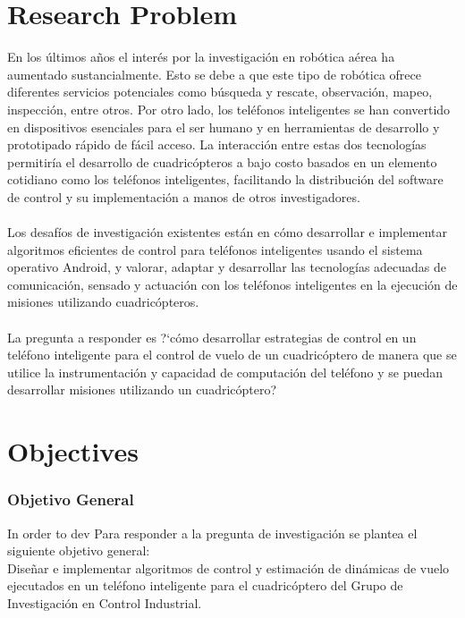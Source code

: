 \section{Research Problem}
En los últimos años el interés por la investigación en robótica aérea ha aumentado sustancialmente. Esto se debe a que este tipo de robótica ofrece diferentes servicios potenciales como búsqueda y rescate, observación, mapeo, inspección, entre otros. Por otro lado, los teléfonos inteligentes se han convertido en dispositivos esenciales para el ser humano y en herramientas de desarrollo y prototipado rápido de fácil acceso. La interacción entre estas dos tecnologías permitiría el desarrollo de cuadricópteros a bajo costo basados en un elemento cotidiano como los teléfonos inteligentes, facilitando la distribución del software de control y su implementación a manos de otros investigadores.
\\\\
Los  desafíos  de  investigación  existentes  están en  cómo  desarrollar  e  implementar  algoritmos eficientes de control para teléfonos inteligentes usando el sistema operativo Android, y  valorar,  adaptar  y  desarrollar  las  tecnologías  adecuadas  de  comunicación,  sensado  y actuación con los teléfonos inteligentes en la ejecución de misiones utilizando cuadricópteros.
\\\\
La pregunta a responder es ?`cómo desarrollar estrategias de control en un teléfono inteligente para el control de vuelo de un cuadricóptero de manera que se utilice la instrumentación y capacidad de computación del teléfono y se puedan desarrollar misiones utilizando un cuadricóptero?\\
\section{Objectives}
\subsubsection{Objetivo General}
In order to dev
Para responder a la pregunta de investigación se plantea el siguiente objetivo general:\\
Diseñar e implementar algoritmos de control y estimación de dinámicas de vuelo ejecutados en un teléfono inteligente para el cuadricóptero del Grupo de Investigación en Control Industrial.

